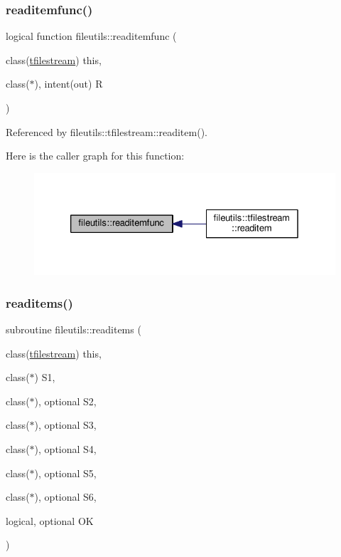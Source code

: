 \mbox{\label{namespacefileutils_a34cb445c075820131b56989e563c773c}} 
\subsubsection{\texorpdfstring{readitemfunc()}{readitemfunc()}}
{\footnotesize\ttfamily logical function fileutils\+::readitemfunc (\begin{DoxyParamCaption}\item[{class(\mbox{\hyperlink{structfileutils_1_1tfilestream}{tfilestream}})}]{this,  }\item[{class($\ast$), intent(out)}]{R }\end{DoxyParamCaption})\hspace{0.3cm}{\ttfamily [private]}}



Referenced by fileutils\+::tfilestream\+::readitem().

Here is the caller graph for this function\+:
\nopagebreak
\begin{figure}[H]
\begin{center}
\leavevmode
\includegraphics[width=326pt]{namespacefileutils_a34cb445c075820131b56989e563c773c_icgraph}
\end{center}
\end{figure}
\mbox{\label{namespacefileutils_add4cb070c36870fe26122c8b1802894b}} 
\subsubsection{\texorpdfstring{readitems()}{readitems()}}
{\footnotesize\ttfamily subroutine fileutils\+::readitems (\begin{DoxyParamCaption}\item[{class(\mbox{\hyperlink{structfileutils_1_1tfilestream}{tfilestream}})}]{this,  }\item[{class($\ast$)}]{S1,  }\item[{class($\ast$), optional}]{S2,  }\item[{class($\ast$), optional}]{S3,  }\item[{class($\ast$), optional}]{S4,  }\item[{class($\ast$), optional}]{S5,  }\item[{class($\ast$), optional}]{S6,  }\item[{logical, optional}]{OK }\end{DoxyParamCaption})\hspace{0.3cm}{\ttfamily [private]}}




